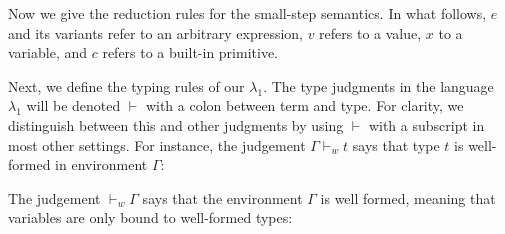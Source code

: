 \documentclass[11pt]{article}
\newcommand{\bind}{\hspace{0.05em}{:}\hspace{0.05em}} %
\newcommand{\col}{\mathbin{:}}       %
\newcommand{\step}{\hookrightarrow}
\newcommand{\Bool}{{\sf Bool}}
\newcommand{\letin}[3]{{\tt let}\,#1\hspace{0.1em}{=}\hspace{0.1em}#2\,{\tt in}\,#3}
\begin{document}
Now we give the reduction rules for the small-step semantics. In what follows, $e$ and its variants refer to an arbitrary expression, $v$ refers to a value, $x$ to a variable, and $c$  refers to a built-in primitive.

Next, we define the typing rules of our $\lambda_1$.
The type judgments in the language $\lambda_1$ will be denoted $\vdash$ with a colon between term and type. For clarity, we distinguish between this and other judgments by using $\vdash$ with a subscript in most other settings. For instance, the judgement $\Gamma \vdash_w t$ says that type $t$ is well-formed in environment $\Gamma$:

The judgement $\vdash_w \Gamma$ says that the environment $\Gamma$ is well formed, meaning that variables are only bound to well-formed types:
\end{document}
